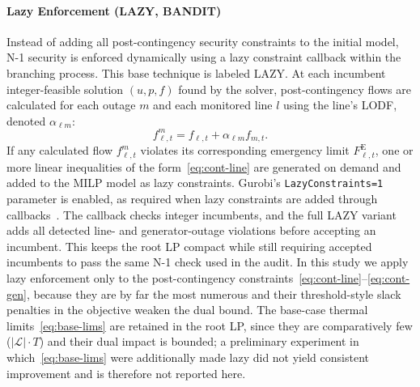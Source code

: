 \documentclass[runningheads]{llncs}
\begin{document}
\paragraph{Lazy Enforcement (LAZY, BANDIT)}
Instead of adding all post-contingency security constraints to the initial model, N-1 security is enforced dynamically using a lazy constraint callback within the branching process. This base technique is labeled LAZY. At each incumbent integer-feasible solution $(u,p,f)$ found by the solver, post-contingency flows are calculated for each outage $m$ and each monitored line
$l$ using the line's LODF, denoted $\alpha_{\ell m}$:
\begin{equation}
f^{m}_{\ell,t}=f_{\ell,t}+\alpha_{\ell m} f_{m,t}.
\end{equation}
If any calculated flow $f^{m}_{\ell,t}$ violates its corresponding emergency limit $F^{\mathrm{E}}_{\ell,t}$, one or more linear inequalities of the form~\eqref{eq:cont-line} are generated on demand and added to the MILP model as lazy constraints. Gurobi's \texttt{LazyConstraints=1} parameter is enabled, as required when lazy constraints are added through callbacks~\cite{GurobiLazy}. The callback checks integer incumbents, and the full LAZY variant adds all detected line- and generator-outage violations before accepting an incumbent. This keeps the root LP compact while still requiring accepted incumbents to pass the same N-1 check used in the audit. In this study we apply lazy enforcement only to the post-contingency constraints~\eqref{eq:cont-line}--\eqref{eq:cont-gen}, because they are by far the most numerous and their threshold-style slack penalties in the objective weaken the dual bound. The base-case thermal limits~\eqref{eq:base-lims} are retained in the root LP, since they are comparatively few ($|\mathcal{L}|\cdot T$) and their dual impact is bounded; a preliminary experiment in which~\eqref{eq:base-lims} were additionally made lazy did not yield consistent improvement and is therefore not reported here.
\end{document}
